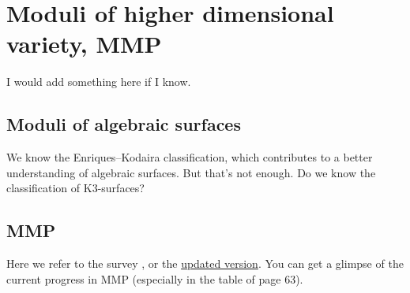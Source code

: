 \section{Moduli of higher dimensional variety, MMP}
I would add something here if I know.
\subsection{Moduli of algebraic surfaces}
We know the Enriques–Kodaira classification, which contributes to a better understanding of algebraic surfaces. But that's not enough. Do we know the classification of K3-surfaces?
\subsection{MMP}
Here we refer to the survey \cite{xu2020kstability}, or the \href{https://math.mit.edu/~cyxu/Kstability.pdf}{updated version}. You can get a glimpse of the current progress in MMP (especially in the table of page 63).